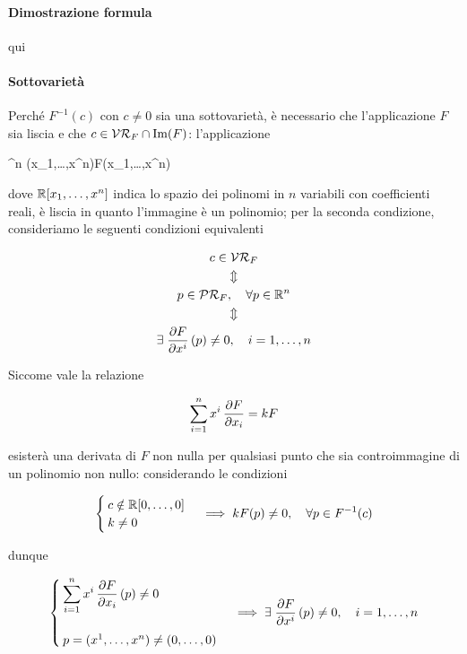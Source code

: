{
\paragraph{Dimostrazione formula}

qui

\paragraph{Sottovarietà}

Perché $ F^{-1}(c) $ con $ c \neq 0 $ sia una sottovarietà, è necessario che l'applicazione $ F $ sia liscia e che $ c \in \mathcal{VR}_{F} \cap \Im(F) $: l'applicazione

	{\R^{n}}{\R[x_{1},\dots,x^{n}]}
	{(x_{1},\dots,x^{n})}{F(x_{1},\dots,x^{n})}

dove $ \mathbb{R}[x_{1},\dots,x^{n}] $ indica lo spazio dei polinomi in $ n $ variabili con coefficienti reali, è liscia in quanto l'immagine è un polinomio; per la seconda condizione, consideriamo le seguenti condizioni equivalenti

\begin{gather}
	c \in \VR_{F} \nonumber \\
	\Updownarrow \nonumber \\
	p \in \PR_{F} \qcomma \forall p \in \R^{n} \\
	\Updownarrow \nonumber \\
	\E \pdv{F}{x^{i}} \, (p) \neq 0 \qcomma i=1,\dots,n \nonumber
\end{gather}

Siccome vale la relazione

\begin{equation}
	\sum_{i=1}^{n} x^{i} \, \pdv{F}{x_{i}} = k F
\end{equation}

esisterà una derivata di $ F $ non nulla per qualsiasi punto che sia controimmagine di un polinomio non nullo: considerando le condizioni

\begin{equation}
	\begin{cases}
		c \notin \R[0,\dots,0] \\
		k \neq 0
	\end{cases} %
	\implies %
	k F(p) \neq 0 \qcomma \forall p \in F^{-1}(c)
\end{equation}

dunque

\begin{equation}
	\begin{cases}
		\displaystyle \sum_{i=1}^{n} x^{i} \, \pdv{F}{x_{i}} \, (p) \neq 0 \\ \\
		p = (x^{1},\dots,x^{n}) \neq (0,\dots,0)
	\end{cases} %
	\implies %
	\E \pdv{F}{x^{i}} \, (p) \neq 0 \qcomma i=1,\dots,n
\end{equation}

}
